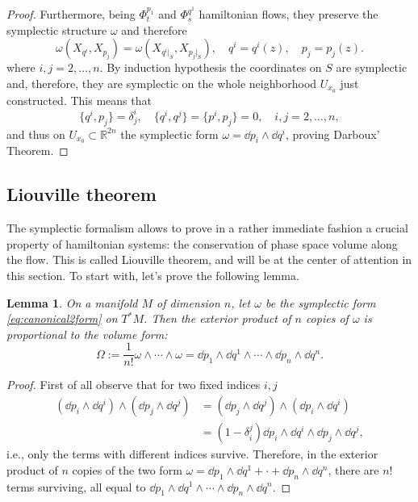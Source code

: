 \documentclass[english,fontsize=11pt,paper=b5]{scrbook}
\numberwithin{equation}{chapter}
\newtheorem{lemma}[theorem]{Lemma}
\theoremstyle{definition}
\begin{document}
\begin{proof}
      Furthermore, being $\Phi_t^{p_1}$ and $\Phi_s^{q^1}$ hamiltonian flows, they preserve the symplectic structure $\omega$ and therefore
      \begin{equation}
        \omega(X_{q^i}, X_{p_j}) = \omega(X_{q^i|_S}, X_{p_j|_S}),
        \quad q^i = q^i(z),
        \quad p_j = p_j(z).
      \end{equation}
      where $i,j=2,\ldots,n$.
      By induction hypothesis the coordinates on $S$ are symplectic and, therefore, they are symplectic on the whole neighborhood $U_{x_0}$ just constructed.
      This means that
      \begin{equation}
        \big\{q^i, p_j\big\} = \delta_j^i, \quad
        \big\{q^i, q^j\big\} = \big\{p^i, p_j\big\} = 0, \quad
        i,j=2,\ldots,n,
      \end{equation}
      and thus on $U_{x_0}\subset\mathbb{R}^{2n}$ the symplectic form $\omega=\dd p_i \wedge \dd q^i$, proving Darboux' Theorem.
    \end{proof}

    \subsection{Liouville theorem}

    The symplectic formalism allows to prove in a rather immediate fashion a crucial property of hamiltonian systems: the conservation of phase space volume along the flow.
    This is called Liouville theorem, and will be at the center of attention in this section.
    To start with, let's prove the following lemma.

    \begin{lemma}
      On a manifold $M$ of dimension $n$, let $\omega$ be the symplectic form \eqref{eq:canonical2form} on $T^* M$. Then the exterior product of $n$ copies of $\omega$ is proportional to the volume form:
      \begin{equation}
        \Omega := \frac1{n!} \omega \wedge \cdots \wedge \omega = \dd p_1 \wedge \dd q^1 \wedge \cdots \wedge \dd p_n \wedge \dd q^n.
      \end{equation}
    \end{lemma}
    \begin{proof}
      First of all observe that for two fixed indices $i,j$
      \begin{align}
        (\dd p_i \wedge \dd q^i)\wedge (\dd p_j \wedge \dd q^j) & =
        (\dd p_j \wedge \dd q^j)\wedge (\dd p_i \wedge \dd q^i)     \\
                                                                & =
                                                                (1-\delta_i^j) \dd p_i \wedge \dd q^i \wedge \dd p_j \wedge \dd q^j,
      \end{align}
      i.e., only the terms with different indices survive.
      Therefore, in the exterior product of $n$ copies of the two form $\omega = \dd p_1 \wedge \dd q^1 + \cdot + \dd p_n \wedge \dd q^n$, there are $n!$ terms surviving, all equal to $\dd p_1 \wedge \dd q^1 \wedge \cdots \wedge \dd p_n \wedge \dd q^n$.
    \end{proof}
\end{document}
